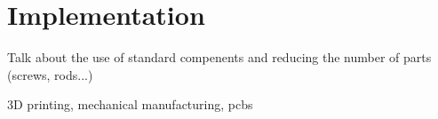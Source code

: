 \chapter{Implementation} %
\label{cha:implementation}

Talk about the use of standard compenents and reducing the number of parts (screws, rods...)

3D printing, mechanical manufacturing, pcbs







